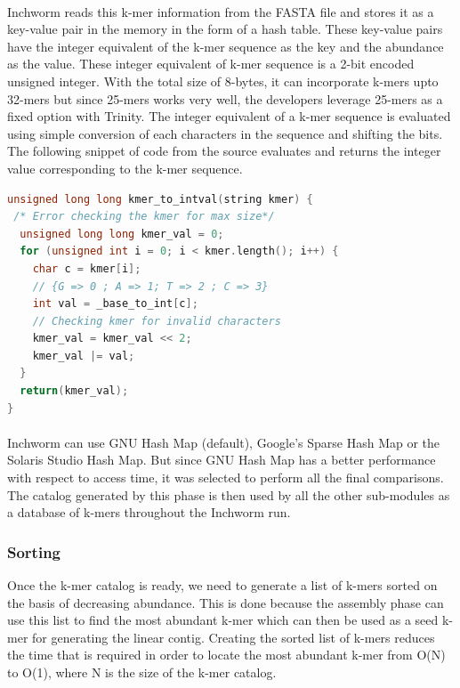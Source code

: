 \label{key}\documentclass[plainarticle, english ,zihtitle,final,hyperref,utf8]{zihpub}
\begin{document}
\paragraph{} Inchworm reads this k-mer information from the FASTA file and stores it as a key-value pair in the memory in the form of a hash table. These key-value pairs have the integer equivalent of the k-mer sequence as the key and the abundance as the value. These integer equivalent of k-mer sequence is a 2-bit encoded unsigned integer. With the total size of 8-bytes, it can incorporate k-mers upto 32-mers but since 25-mers works very well, the developers leverage 25-mers as a fixed option with Trinity. The integer equivalent of a k-mer sequence is evaluated using simple conversion of each  characters in the sequence and shifting the bits. The following snippet of code from the source evaluates and returns the integer value corresponding to the k-mer sequence.
\begin{center}
\begin{lstlisting}[language=C++]
unsigned long long kmer_to_intval(string kmer) {  
 /* Error checking the kmer for max size*/
  unsigned long long kmer_val = 0;  
  for (unsigned int i = 0; i < kmer.length(); i++) {
	char c = kmer[i];
	// {G => 0 ; A => 1; T => 2 ; C => 3}
	int val = _base_to_int[c];
	// Checking kmer for invalid characters
	kmer_val = kmer_val << 2;
	kmer_val |= val;	
  }  
  return(kmer_val);
}
\end{lstlisting}
\end{center}
\paragraph{} Inchworm can use GNU Hash Map (default), Google's Sparse Hash Map or the  Solaris Studio Hash Map. But since GNU Hash Map has a better performance with respect to access time, it was selected to perform all the final comparisons. The catalog generated by this phase is then used by all the other sub-modules as a database of k-mers throughout the Inchworm run.
\subsubsection{Sorting}
Once the k-mer catalog is ready, we need to generate a list of k-mers sorted on the basis of decreasing abundance. This is done because the assembly phase can use this list to find the most abundant k-mer which can then be used as a seed k-mer for generating the linear contig. Creating the sorted list of k-mers reduces the time that is required in order to locate the most abundant k-mer from O(N) to O(1), where N is the size of the k-mer catalog.
\end{document}
